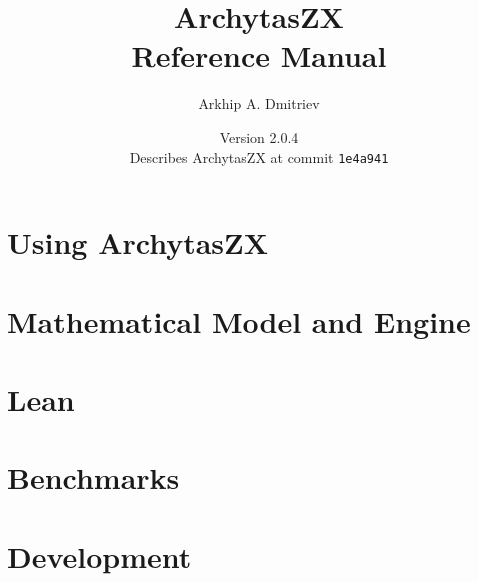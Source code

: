 \documentclass[11pt,oneside]{book}
\title{ArchytasZX\\[0.5ex]\large Reference Manual}
\author{Arkhip A. Dmitriev}
\date{Version 2.0.4\\[0.5ex]\normalsize Describes ArchytasZX at commit \texttt{1e4a941}}
\begin{document}
\frontmatter
\hypersetup{pageanchor=false}
\maketitle
\hypersetup{pageanchor=true}
\tableofcontents

\mainmatter

\part{Using ArchytasZX}






\part{Mathematical Model and Engine}











\part{Lean}







\part{Benchmarks}



\part{Development}


\appendix





\backmatter


\printindex
\end{document}
